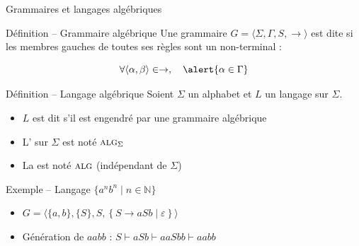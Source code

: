 
\begingroup

\begin{frame}{Grammaires et langages algébriques}

  \begin{block}{Définition -- Grammaire algébrique}
    Une grammaire $G = \langle \Sigma, \Gamma, S, \rightarrow \rangle$ est dite  si les membres gauches de toutes ses règles sont un non-terminal :

    $$\forall \langle \alpha, \beta\rangle \in \rightarrow, \quad \alert{\alpha \in \Gamma}$$
  \end{block}

  \vspace{-2mm}
  \begin{block}{Définition -- Langage algébrique}
    Soient $\Sigma$ un alphabet et $L$ un langage sur $\Sigma$.
    \begin{itemize}
    \item $L$ est dit  s'il est engendré par une grammaire algébrique
    \item L' sur $\Sigma$ est noté \alert{$\textsc{alg}_\Sigma$}
    \item La  est noté \alert{$\textsc{alg}$} (indépendant de $\Sigma$)
    \end{itemize}
  \end{block}

  \begin{exampleblock}{Exemple -- Langage $\{a^n b^n \mid n\in \mathbb{N}\}$}
    \begin{itemize}
    \item $G = \langle \{a, b\}, \{S\}, S, \left\{S \rightarrow a S b \mid \varepsilon \right\} \rangle $
    \item Génération de $aabb$ : $ S \vdash aSb \vdash aaSbb \vdash aabb $
    \end{itemize}
  \end{exampleblock}
  
\end{frame}

\endgroup
\endinput
